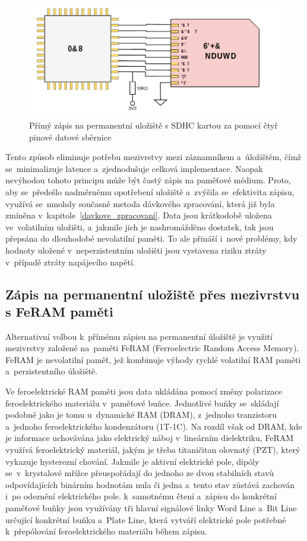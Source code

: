 \begin{figure}[h]
    \centering
    \includegraphics[width=1.00\textwidth]{obrazky-figures/forward_write.pdf}
    
    \caption{Přímý zápis na permanentní uložiště s SDHC kartou za pomocí čtyř pinové datové sběrnice}
    \label{fig:forward-write}
\end{figure}

Tento způsob eliminuje potřebu mezivrstvy mezi záznamníkem a~úložištěm, čímž se~minimalizuje latence a~zjednodušuje celková implementace. Naopak nevýhodou tohoto principu může být častý zápis na paměťové médium. Proto, aby se~předešlo nadměrnému opotřebení uložiště a~zvýšila se~efektivita zápisu, využívá se~mnohdy současně metoda dávkového zpracování, která již byla zmíněna v~kapitole~\ref{davkove_zpracovani}. Data jsou krátkodobě uložena ve~volatilním uložišti, a~jakmile jich je nashromážděno dostatek, tak jsou přepsána do dlouhodobé nevolatilní paměti. To ale přináší i~nové problémy, kdy hodnoty uložené v~neperzistentním uložišti jsou vystavena riziku ztráty v~případě ztráty napájecího napětí.~\cite{ieee_digital_sound_recorder_arm_sd_card}

\subsection{Zápis na permanentní uložiště přes mezivrstvu s FeRAM paměti}
Alternativní volbou k~přímému zápisu na permanentní úložiště je využití mezivrstvy založené na~paměti FeRAM (Ferroelectric Random Access Memory). FeRAM je nevolatilní paměť, jež kombinuje výhody rychlé volatilní RAM paměti a~perzistentního úložiště.

Ve feroelektrické RAM paměti jsou data ukládána pomocí změny polarizace feroelektrického materiálu v~paměťové buňce. Jednotlivé buňky se~skládají podobně jako je tomu u~dynamické RAM (DRAM), z~jednoho tranzistoru a~jednoho feroelektrického kondenzátoru (1T-1C). Na rozdíl však od DRAM, kde je informace uchovávána jako elektrický náboj v~lineárním dielektriku, FeRAM využívá feroelektrický materiál, jakým je třeba titaničitan olovnatý (PZT), který vykazuje hysterezní chování. Jakmile je aktivní elektrické pole, dipóly se~v~krystalové mřížce přeuspořádají do jednoho ze dvou stabilních stavů odpovídajících binárním hodnotám nula či jedna a~tento stav zůstává zachován i~po odeznění elektrického pole. k~samotnému čtení a~zápisu do konkrétní paměťové buňky jsou využívány tři hlavní signálové linky Word Line a~Bit Line určující konkrétní buňku a~Plate Line, která vytváří elektrické pole potřebné k~přepólování feroelektrického materiálu během zápisu.~\cite{ieee_feram_ultra_high_density_embedded_mem}


